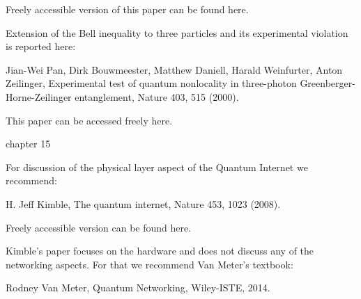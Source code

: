 Freely accessible version of this paper can be found here.

Extension of the Bell inequality to three particles and its experimental violation is reported here:

Jian-Wei Pan, Dirk Bouwmeester, Matthew Daniell, Harald Weinfurter, Anton Zeilinger, Experimental test of quantum nonlocality in three-photon Greenberger-Horne-Zeilinger entanglement, Nature 403, 515 (2000).

This paper can be accessed freely here.

chapter 15

For discussion of the physical layer aspect of the Quantum Internet we recommend:

H. Jeff Kimble, The quantum internet, Nature 453, 1023 (2008).

Freely accessible version can be found here.

Kimble’s paper focuses on the hardware and does not discuss any of the networking aspects. For that we recommend Van Meter’s textbook:

Rodney Van Meter, Quantum Networking, Wiley-ISTE, 2014.
